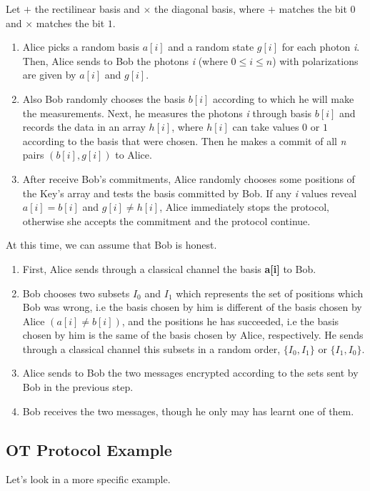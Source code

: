 Let $+$ the rectilinear basis and $\times$ the diagonal basis, where $+$ matches the bit $0$ and $\times$ matches the bit $1$.
\begin{enumerate}
	\item{Alice picks a random basis $a[i]$ and a random state $g[i]$ for each photon \textit{i}. Then, Alice sends to Bob the photons \textit{i} (where $0\le i \le n$) with polarizations are given by $a[i]$ and $g[i]$.}
	\item{Also Bob randomly chooses the basis $b[i]$ according to which he will make the measurements. Next, he measures the photons \textit{i} through basis $b[i]$ and records the data in an array $h[i]$, where $h[i]$ can take values $0$ or $1$ according to the basis that were chosen. Then he makes a commit of all \textit{n} pairs $(b[i],g[i])$ to Alice.}
	\item{After receive Bob's commitments, Alice randomly chooses some positions of the Key's array and tests the basis committed by Bob. If any \textit{i} values reveal $a[i]=b[i]$ and $g[i] \neq h[i]$, Alice immediately stops the protocol, otherwise she accepts the commitment and the protocol continue.}
\end{enumerate}

At this time, we can assume that Bob is honest.
\begin{enumerate}
	\item{First, Alice sends through a classical channel the basis \textbf{a[i]} to Bob.}
	\item{Bob chooses two subsets $I_{0}$ and $I_{1}$ which represents the set of positions which Bob was wrong, i.e the basis chosen by him is different of the basis chosen by Alice $(a[i]\neq b[i])$,  and the positions he has succeeded, i.e the basis chosen by him is the same of the basis chosen by Alice, respectively. He sends through a classical channel this subsets in a random order, $\{ I_{0},I_{1} \}$ or $\{ I_{1},I_{0} \}$.}
	\item{Alice sends to Bob the two messages encrypted according to the sets sent by Bob in the previous step.}
	\item{Bob receives the two messages, though he only may has learnt one of them.}
\end{enumerate}

\subsection{OT Protocol Example}

Let's look in a more specific example.

